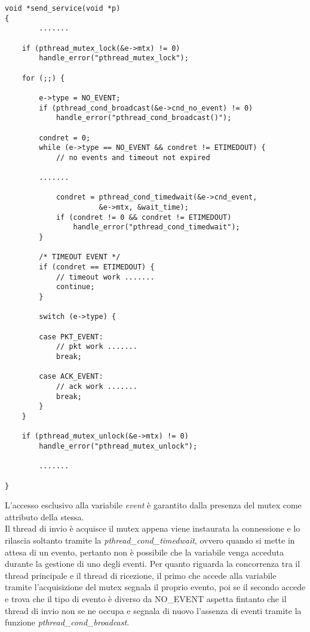 \begin{lstlisting}[title=transport.c]
void *send_service(void *p)
{
		.......

    if (pthread_mutex_lock(&e->mtx) != 0)
        handle_error("pthread_mutex_lock");

    for (;;) {

        e->type = NO_EVENT;
        if (pthread_cond_broadcast(&e->cnd_no_event) != 0)
            handle_error("pthread_cond_broadcast()");

        condret = 0;
        while (e->type == NO_EVENT && condret != ETIMEDOUT) {
            // no events and timeout not expired

		.......

            condret = pthread_cond_timedwait(&e->cnd_event,
                      &e->mtx, &wait_time);
            if (condret != 0 && condret != ETIMEDOUT)
                handle_error("pthread_cond_timedwait");
        }

        /* TIMEOUT EVENT */
        if (condret == ETIMEDOUT) {
            // timeout work .......
            continue;
        }

        switch (e->type) {

        case PKT_EVENT:
            // pkt work .......
            break;

        case ACK_EVENT:
            // ack work .......
            break;
        }
    }

    if (pthread_mutex_unlock(&e->mtx) != 0)
        handle_error("pthread_mutex_unlock");

		.......

}
\end{lstlisting}

L'accesso esclusivo alla variabile \emph{event} è garantito dalla presenza
del mutex come attributo della stessa.\\
Il thread di invio è acquisce il mutex appena viene instaurata la connessione
e lo rilascia soltanto tramite la \emph{pthread\_cond\_timedwait}, ovvero
quando si mette in attesa di un evento, pertanto non è possibile che la 
variabile venga acceduta durante la gestione di uno degli eventi.
Per quanto riguarda la concorrenza tra il thread principale e il thread di
ricezione, il primo che accede alla variabile tramite l'acquisizione del
mutex segnala il proprio evento, poi se il secondo accede e trova che il tipo
di evento è diverso da NO\_EVENT aspetta fintanto che il thread di invio 
non se ne occupa e segnala di nuovo l'assenza di eventi tramite la funzione
\emph{pthread\_cond\_broadcast}.

